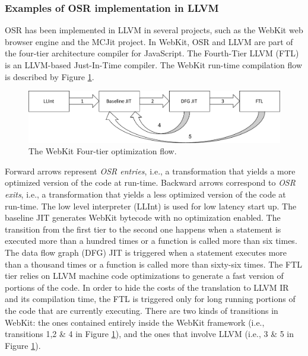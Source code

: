 \subsubsection{Examples of OSR implementation in LLVM}

OSR has been implemented in LLVM in several projects, such as the WebKit web browser engine and the MCJit project.
In WebKit, OSR and LLVM are part of the four-tier architecture compiler for JavaScript.
The Fourth-Tier LLVM (FTL) is an LLVM-based Just-In-Time compiler.
The WebKit run-time compilation flow is described by Figure \ref{FTL}.\\
\begin{figure}[h]
\centering
\includegraphics[scale=0.5]{Figures/FTL}
\decoRule
\caption[The WebKit FTL]{The WebKit Four-tier optimization flow.}
\label{FTL}
\end{figure}
 
Forward arrows represent \textit{OSR entries}, i.e., a transformation that yields a more optimized version of the code at run-time.
Backward arrows correspond to \textit{OSR exits}, i.e., a transformation that yields a less optimized version of the code at run-time.
The low level interpreter (LLInt) is used for low latency start up.
The baseline JIT generates WebKit bytecode with no optimization enabled.
The transition from the first tier to the second one happens when a statement is executed more than a hundred times or a function is called more than six times.
The data flow graph (DFG) JIT is triggered when a statement executes more than a thousand times or a function is called more than sixty-six times.
The FTL tier relies on LLVM machine code optimizations to generate a fast version of portions of the code.
In order to hide the costs of the translation to LLVM IR and its compilation time, the FTL is triggered only for long running portions of the code that are currently executing.
There are two kinds of transitions in WebKit: the ones contained entirely inside the WebKit framework (i.e., transitions 1,2 \& 4 in Figure \ref{FTL}), and the ones that involve LLVM (i.e., 3 \& 5 in Figure \ref{FTL}).\\

